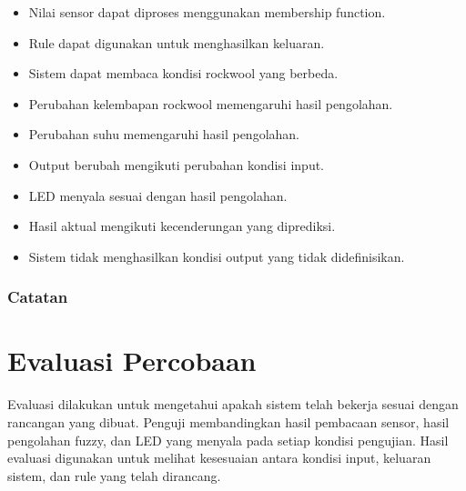 \documentclass[12pt,a4paper]{article}
\newcommand{\checkbox}{\ensuremath{\square}}
\begin{document}
\begin{itemize}
    \item[$\checkbox$] Nilai sensor dapat diproses menggunakan membership function.
    \item[$\checkbox$] Rule dapat digunakan untuk menghasilkan keluaran.
    \item[$\checkbox$] Sistem dapat membaca kondisi rockwool yang berbeda.
    \item[$\checkbox$] Perubahan kelembapan rockwool memengaruhi hasil pengolahan.
    \item[$\checkbox$] Perubahan suhu memengaruhi hasil pengolahan.
    \item[$\checkbox$] Output berubah mengikuti perubahan kondisi input.
    \item[$\checkbox$] LED menyala sesuai dengan hasil pengolahan.
    \item[$\checkbox$] Hasil aktual mengikuti kecenderungan yang diprediksi.
    \item[$\checkbox$] Sistem tidak menghasilkan kondisi output yang tidak didefinisikan.
\end{itemize}

\subsubsection*{Catatan}

\noindent
\makebox[\textwidth]{\hrulefill}

\vspace{0.4cm}

\noindent
\makebox[\textwidth]{\hrulefill}

\vspace{0.4cm}

\noindent
\makebox[\textwidth]{\hrulefill}

\section{Evaluasi Percobaan}

Evaluasi dilakukan untuk mengetahui apakah sistem telah bekerja sesuai dengan rancangan yang dibuat. Penguji membandingkan hasil pembacaan sensor, hasil pengolahan fuzzy, dan LED yang menyala pada setiap kondisi pengujian. Hasil evaluasi digunakan untuk melihat kesesuaian antara kondisi input, keluaran sistem, dan rule yang telah dirancang.
\end{document}
